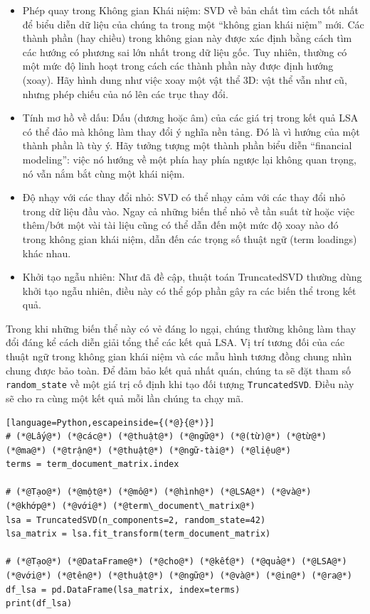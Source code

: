 \begin{itemize}
  \item Phép quay trong Không gian Khái niệm: SVD về bản chất tìm cách tốt nhất để biểu diễn dữ liệu của chúng ta trong một ``không gian khái niệm'' mới. Các thành phần (hay chiều) trong không gian này được xác định bằng cách tìm các hướng có phương sai lớn nhất trong dữ liệu gốc. Tuy nhiên, thường có một mức độ linh hoạt trong cách các thành phần này được định hướng (xoay). Hãy hình dung như việc xoay một vật thể 3D: vật thể vẫn như cũ, nhưng phép chiếu của nó lên các trục thay đổi.

  \item Tính mơ hồ về dấu: Dấu (dương hoặc âm) của các giá trị trong kết quả LSA có thể đảo mà không làm thay đổi ý nghĩa nền tảng. Đó là vì hướng của một thành phần là tùy ý. Hãy tưởng tượng một thành phần biểu diễn ``financial modeling'': việc nó hướng về một phía hay phía ngược lại không quan trọng, nó vẫn nắm bắt cùng một khái niệm.

  \item Độ nhạy với các thay đổi nhỏ: SVD có thể nhạy cảm với các thay đổi nhỏ trong dữ liệu đầu vào. Ngay cả những biến thể nhỏ về tần suất từ hoặc việc thêm/bớt một vài tài liệu cũng có thể dẫn đến một mức độ xoay nào đó trong không gian khái niệm, dẫn đến các trọng số thuật ngữ (term loadings) khác nhau.

  \item Khởi tạo ngẫu nhiên: Như đã đề cập, thuật toán TruncatedSVD thường dùng khởi tạo ngẫu nhiên, điều này có thể góp phần gây ra các biến thể trong kết quả.
\end{itemize}

Trong khi những biến thể này có vẻ đáng lo ngại, chúng thường không làm thay đổi đáng kể cách diễn giải tổng thể các kết quả LSA. Vị trí tương đối của các thuật ngữ trong không gian khái niệm và các mẫu hình tương đồng chung nhìn chung được bảo toàn. Để đảm bảo kết quả nhất quán, chúng ta sẽ đặt tham số \texttt{random\_state} về một giá trị cố định khi tạo đối tượng \texttt{TruncatedSVD}. Điều này sẽ cho ra cùng một kết quả mỗi lần chúng ta chạy mã.

\begin{lstlisting}[language=Python,escapeinside={(*@}{@*)}]
# (*@Lấy@*) (*@các@*) (*@thuật@*) (*@ngữ@*) (*@(từ)@*) (*@từ@*) (*@ma@*) (*@trận@*) (*@thuật@*) (*@ngữ-tài@*) (*@liệu@*)
terms = term_document_matrix.index

# (*@Tạo@*) (*@một@*) (*@mô@*) (*@hình@*) (*@LSA@*) (*@và@*) (*@khớp@*) (*@với@*) (*@term\_document\_matrix@*)
lsa = TruncatedSVD(n_components=2, random_state=42)
lsa_matrix = lsa.fit_transform(term_document_matrix)

# (*@Tạo@*) (*@DataFrame@*) (*@cho@*) (*@kết@*) (*@quả@*) (*@LSA@*) (*@với@*) (*@tên@*) (*@thuật@*) (*@ngữ@*) (*@và@*) (*@in@*) (*@ra@*)
df_lsa = pd.DataFrame(lsa_matrix, index=terms)
print(df_lsa)
\end{lstlisting}

